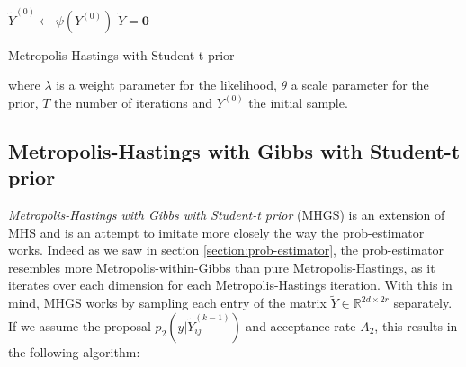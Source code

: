 \documentclass[12pt]{memoir}
\newcommand{\mb}{\mathbf}
\begin{document}
\begin{algorithm}[H]
    \DontPrintSemicolon

    $\tilde Y^{(0)} \gets \psi(Y^{(0)})$\;
    $\tilde Y = \mb 0$\;
    \caption{Metropolis-Hastings with Student-t prior}
\end{algorithm}\medbreak
where $\lambda$ is a weight parameter for the likelihood, $\theta$ a scale parameter for the prior, $T$ the number of iterations and $Y^{(0)}$ the initial sample.\medbreak


\subsection*{Metropolis-Hastings with Gibbs with Student-t prior}
\textit{Metropolis-Hastings with Gibbs with Student-t prior} (MHGS) is an extension of MHS and is an attempt to imitate more closely the way the prob-estimator works. Indeed as we saw in section \ref{section:prob-estimator}, the prob-estimator resembles more Metropolis-within-Gibbs than pure Metropolis-Hastings, as it iterates over each dimension for each Metropolis-Hastings iteration. With this in mind, MHGS works by sampling each entry of the matrix $\tilde Y \in \mathbb{R}^{2d\times 2r}$ separately. If we assume the proposal $p_2(y|\tilde Y^{(k-1)}_{ij})$ and acceptance rate $A_2$, this results in the following algorithm:\medbreak
\end{document}
